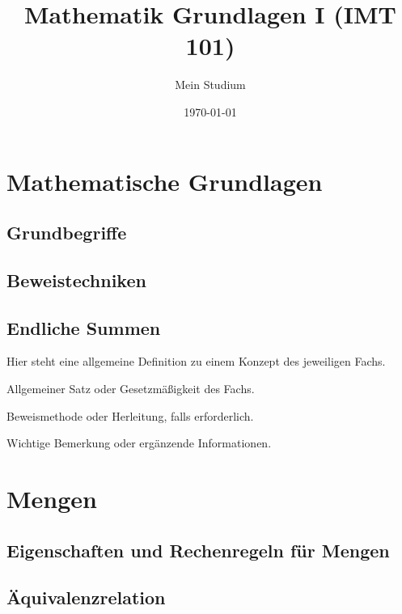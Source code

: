 \documentclass[a4paper,10pt]{article}
\begin{document}
\title{Mathematik Grundlagen I (IMT 101)}
\author{Mein Studium}
\date{\today}
\maketitle


\section{Mathematische Grundlagen}

\subsection{Grundbegriffe}
\subsection{Beweistechniken}
\subsection{Endliche Summen}


\begin{definitionbox}
Hier steht eine allgemeine Definition zu einem Konzept des jeweiligen Fachs.
\end{definitionbox}
\begin{satzbox}
Allgemeiner Satz oder Gesetzmäßigkeit des Fachs.
\end{satzbox}
\begin{beweisbox}
Beweismethode oder Herleitung, falls erforderlich.
\end{beweisbox}
\begin{hinweisbox}
Wichtige Bemerkung oder ergänzende Informationen.
\end{hinweisbox}








\section{Mengen}
\subsection{Eigenschaften und Rechenregeln für Mengen}
\subsection{Äquivalenzrelation}
\end{document}
